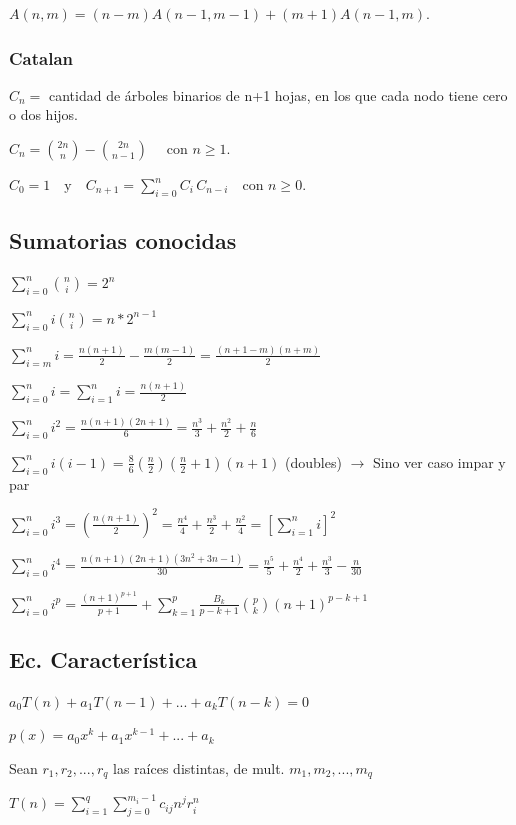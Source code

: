 {{{\( {\displaystyle A(n,m)=(n-m)A(n-1,m-1)+(m+1)A(n-1,m).} \)
}
\subsubsection{Catalan}
{
\( {\displaystyle C_{n}=} \) cantidad de árboles binarios de n+1 hojas, en los que cada nodo tiene cero o dos hijos.

\({\displaystyle C_{n}={2n \choose n}-{2n \choose n-1}\quad {\mbox{ con }}n\geq 1.} \)

\( {\displaystyle C_{0}=1\quad {\mbox{y}}\quad C_{n+1}=\sum _{i=0}^{n}C_{i}\,C_{n-i}\quad {\mbox{con }}n\geq 0.} \)
}

}

\subsection{Sumatorias conocidas}
{
$\sum_{i=0}^n\binom{n}{i}=2^n$

$\sum_{i=0}^n i\binom{n}{i}=n*2^{n-1}$

$\sum_{i=m}^n i = \frac{n(n+1)}{2} - \frac{m(m-1)}{2} = \frac{(n+1-m)(n+m)}{2}$

$\sum_{i=0}^n i = \sum_{i=1}^n i = \frac{n(n+1)}{2}$

$\sum_{i=0}^n i^2 = \frac{n(n+1)(2n+1)}{6} = \frac{n^3}{3} + \frac{n^2}{2} + \frac{n}{6}$

$\sum_{i=0}^n i(i-1) = \frac{8}{6}(\frac{n}{2})(\frac{n}{2}+1)(n+1)$ (doubles) $\rightarrow$ Sino ver caso impar y par

$\sum_{i=0}^n i^3 = \left(\frac{n(n+1)}{2}\right)^2 = \frac{n^4}{4} + \frac{n^3}{2} + \frac{n^2}{4} = \left[\sum_{i=1}^n i\right]^2$

$\sum_{i=0}^n i^4 = \frac{n(n+1)(2n+1)(3n^2+3n-1)}{30} = \frac{n^5}{5} + \frac{n^4}{2} + \frac{n^3}{3} - \frac{n}{30}$

$\sum_{i=0}^n i^p = \frac{(n+1)^{p+1}}{p+1} + \sum_{k=1}^p\frac{B_k}{p-k+1}{p\choose k}(n+1)^{p-k+1}$

}

\subsection{Ec. Característica}
$a_0T(n)+a_1T(n-1)+...+a_kT(n-k)=0$

$p(x)=a_0 x^k + a_1 x^{k-1} + ... + a_k$

Sean $r_1,r_2,...,r_q$ las raíces distintas, de mult. $m_1, m_2, ..., m_q$

$T(n)=\sum_{i=1}^q{\sum_{j=0}^{m_i - 1}c_{ij} n^j r_i^n}$

}
